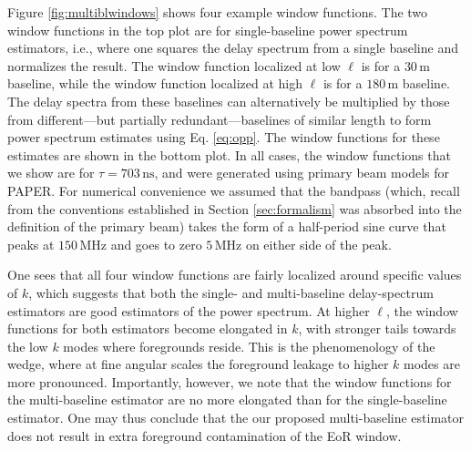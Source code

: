 \documentclass[twocolumn,apj,numberedappendix]{emulateapj}
\renewcommand\[{\begin{equation}}
\renewcommand\]{\end{equation}}
\begin{document}
Figure \ref{fig:multiblwindows} shows four example window functions. The two window functions in the top plot are for single-baseline power spectrum estimators, i.e., where one squares the delay spectrum from a single baseline and normalizes the result. The window function localized at low $\ell$ is for a $30\,\textrm{m}$ baseline, while the window function localized at high $\ell$ is for a $180\,\textrm{m}$ baseline. The delay spectra from these baselines can alternatively be multiplied by those from different---but partially redundant---baselines of similar length to form power spectrum estimates using Eq. \eqref{eq:opp}. The window functions for these estimates are shown in the bottom plot. In all cases, the window functions that we show are for $\tau = 703\,\textrm{ns}$, and were generated using primary beam models for PAPER. For numerical convenience we assumed that the bandpass (which, recall from the conventions established in Section \ref{sec:formalism} was absorbed into the definition of the primary beam) takes the form of a half-period sine curve that peaks at $150\,\textrm{MHz}$ and goes to zero $5\,\textrm{MHz}$ on either side of the peak.

One sees that all four window functions are fairly localized around specific values of $k$, which suggests that both the single- and multi-baseline delay-spectrum estimators are good estimators of the power spectrum. At higher $\ell$, the window functions for both estimators become elongated in $k$, with stronger tails towards the low $k$ modes where foregrounds reside. This is the phenomenology of the wedge, where at fine angular scales the foreground leakage to higher $k$ modes are more pronounced. Importantly, however, we note that the window functions for the multi-baseline estimator are no more elongated than for the single-baseline estimator. One may thus conclude that the our proposed multi-baseline estimator does not result in extra foreground contamination of the EoR window.

\end{document}
